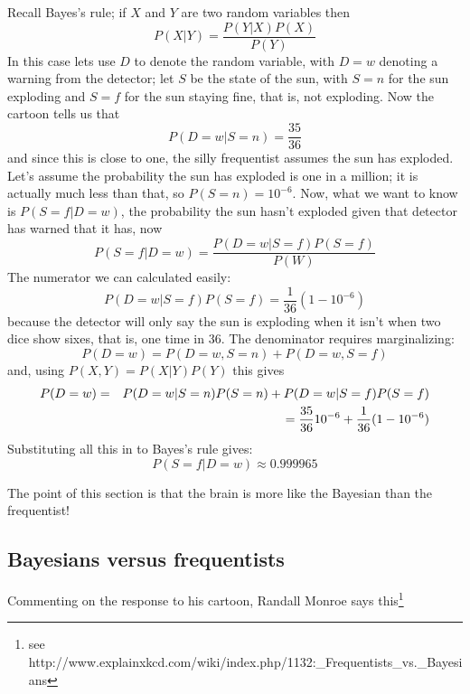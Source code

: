 \documentclass{article}
\begin{document}
Recall Bayes's rule; if $X$ and $Y$ are two random variables then
\begin{equation}
P(X|Y)=\frac{P(Y|X)P(X)}{P(Y)}
\end{equation}
In this case lets use $D$ to denote the random variable, with $D=w$
denoting a warning from the detector; let $S$ be the state of the sun,
with $S=n$ for the sun exploding and $S=f$ for the sun staying fine,
that is, not exploding. Now the cartoon tells us that
\begin{equation}
P(D=w|S=n)=\frac{35}{36}
\end{equation}
and since this is close to one, the silly frequentist assumes the sun
has exploded. Let's assume the probability the sun has exploded is one
in a million; it is actually much less than that, so
$P(S=n)=10^{-6}$. Now, what we want to know is $P(S=f|D=w)$, the probability the sun hasn't exploded given that detector has warned that it has, now
\begin{equation}
P(S=f|D=w)=\frac{P(D=w|S=f)P(S=f)}{P(W)}
\end{equation}
The numerator we can calculated easily:
\begin{equation}
P(D=w|S=f)P(S=f)=\frac{1}{36}(1-10^{-6})
\end{equation}
because the detector will only say the sun is exploding when it isn't when two dice show sixes, that is, one time in 36. The denominator requires marginalizing:
\begin{equation}
P(D=w)=P(D=w,S=n)+P(D=w,S=f)
\end{equation}
and, using $P(X,Y)=P(X|Y)P(Y)$ this gives
\begin{eqnarray}
P(D=w) &=& P(D=w|S=n)P(S=n)+P(D=w|S=f)P(S=f)\cr
&&=\frac{35}{36}10^{-6}+\frac{1}{36}(1-10^{-6})
\end{eqnarray}
Substituting all this in to Bayes's rule gives:
\begin{equation}
P(S=f|D=w)\approx 0.999965
\end{equation}

The point of this section is that the brain is more like the Bayesian than the frequentist!

\subsection*{Bayesians versus frequentists}

Commenting on the response to his cartoon, Randall Monroe says this\footnote{see http://www.explainxkcd.com/wiki/index.php/1132:\_Frequentists\_vs.\_Bayesians}
\end{document}
